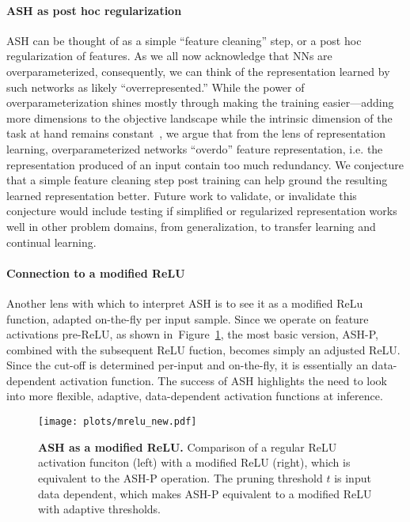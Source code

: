 \documentclass{article}
\newcommand{\figlabel}[1]{\label{fig:#1}}
\newcommand{\figref}[1]{Figure~\ref{fig:#1}}
\begin{document}
\paragraph{ASH as post hoc regularization} ASH can be thought of as a simple ``feature cleaning'' step, or a post hoc regularization of features.
As we all now acknowledge that NNs are overparameterized, consequently, we can think of the representation learned by such networks as likely ``overrepresented.'' While the power of overparameterization shines mostly through making the training easier—adding more dimensions to the objective landscape while the intrinsic dimension of the task at hand remains constant~\citep{LiFLY18}, we argue that from the lens of representation learning, overparameterized networks ``overdo'' feature representation, i.e. the representation produced of an input contain too much redundancy. We  conjecture that a simple feature cleaning step post training can help ground the resulting learned representation better. Future work to validate, or invalidate this conjecture would include testing if simplified or regularized representation works well in other problem domains, from generalization, to transfer learning and continual learning.





\paragraph{Connection to a modified ReLU} Another lens with which to interpret ASH is to see it as a modified ReLu function, adapted on-the-fly per input sample. Since we operate on feature activations pre-ReLU, as shown in~\figref{mrelu}, the most basic version, ASH-P, combined with the subsequent ReLU fuction, becomes simply an adjusted ReLU. Since the cut-off is determined per-input and on-the-fly, it is essentially an data-dependent activation function. The success of ASH highlights the need to look into more flexible, adaptive, data-dependent activation functions at inference. 

\begin{figure}[hbt!]
    \centering 
	\texttt{[image: plots/mrelu\_new.pdf]}
	\caption{\textbf{ASH as a modified ReLU.} Comparison of a regular ReLU activation funciton (left) with a modified ReLU (right), which is equivalent to the ASH-P operation. The pruning threshold $t$ is input data dependent, which makes ASH-P equivalent to a modified ReLU with adaptive thresholds.}
	\figlabel{mrelu}
\end{figure}
\end{document}
